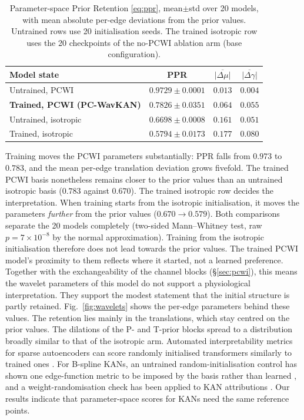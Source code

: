 \documentclass[preprint,12pt]{elsarticle}
\begin{document}
\begin{table}[!htbp]
\centering
\caption{Parameter-space Prior Retention \eqref{eq:ppr}, mean$\pm$std over 20 models, with mean absolute per-edge deviations from the prior values. Untrained rows use 20 initialisation seeds. The trained isotropic row uses the 20 checkpoints of the no-PCWI ablation arm (base configuration).}
\label{tab:ppr}
\footnotesize
\begin{tabular}{l c c c}
\toprule
\textbf{Model state} & \textbf{PPR} & $\overline{|\Delta\mu|}$ & $\overline{|\Delta\gamma|}$ \\ \midrule
Untrained, PCWI & $0.9729\pm0.0001$ & $0.013$ & $0.004$ \\
\textbf{Trained, PCWI (PC-WavKAN)} & $\mathbf{0.7826\pm0.0351}$ & $0.064$ & $0.055$ \\
Untrained, isotropic & $0.6698\pm0.0008$ & $0.161$ & $0.051$ \\
Trained, isotropic & $0.5794\pm0.0173$ & $0.177$ & $0.080$ \\ \bottomrule
\end{tabular}
\end{table}

Training moves the PCWI parameters substantially: PPR falls from $0.973$ to $0.783$, and the mean per-edge translation deviation grows fivefold. The trained PCWI basis nonetheless remains closer to the prior values than an untrained isotropic basis ($0.783$ against $0.670$). The trained isotropic row decides the interpretation. When training starts from the isotropic initialisation, it moves the parameters \emph{further} from the prior values ($0.670 \rightarrow 0.579$). Both comparisons separate the 20 models completely (two-sided Mann--Whitney test, raw $p = 7\times10^{-8}$ by the normal approximation). Training from the isotropic initialisation therefore does not lead towards the prior values. The trained PCWI model's proximity to them reflects where it started, not a learned preference. Together with the exchangeability of the channel blocks (\S\ref{sec:pcwi}), this means the wavelet parameters of this model do not support a physiological interpretation. They support the modest statement that the initial structure is partly retained. Fig.~\ref{fig:wavelets} shows the per-edge parameters behind these values. The retention lies mainly in the translations, which stay centred on the prior values. The dilations of the P- and T-prior blocks spread to a distribution broadly similar to that of the isotropic arm. Automated interpretability metrics for sparse autoencoders can score randomly initialised transformers similarly to trained ones \cite{heap_automated_2025}. For B-spline KANs, an untrained random-initialisation control has shown one edge-function metric to be imposed by the basis rather than learned \cite{alves_kan_2026}, and a weight-randomisation check has been applied to KAN attributions \cite{mysore_temporal_2026}. Our results indicate that parameter-space scores for KANs need the same reference points.
\end{document}
